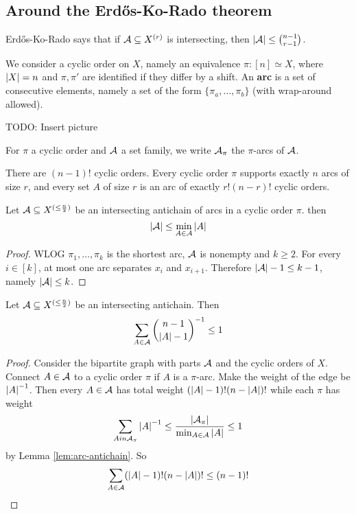 \documentclass{article}
\begin{document}
\clearpage

\subsection{Around the Erd\H os-Ko-Rado theorem}

Erd\H os-Ko-Rado says that if $\mathcal A \subseteq X^{(r)}$ is intersecting, then $\left\lvert \mathcal A\right\rvert \le \binom{n - 1}{r - 1}$.

\newlec

\begin{defi}
  We consider a cyclic order on $X$, namely an equivalence $\pi : [n] \simeq X$, where $\left\lvert X\right\rvert = n$ and $\pi, \pi'$ are identified if they differ by a shift. An {\bf arc} is a set of consecutive elements, namely a set of the form $\{\pi_a, \dots, \pi_b\}$ (with wrap-around allowed).
  
  TODO: Insert picture
  
  For $\pi$ a cyclic order and $\mathcal A$ a set family, we write $\mathcal A_\pi$ the $\pi$-arcs of $\mathcal A$.

  There are $(n - 1)!$ cyclic orders. Every cyclic order $\pi$ supports exactly $n$ arcs of size $r$, and every set $A$ of size $r$ is an arc of exactly $r!(n - r)!$ cyclic orders.
\end{defi}

\begin{nlemma}\label{lem:arc-antichain}
  Let $\mathcal A \subseteq X^{(\le \frac n2)}$ be an intersecting antichain of arcs in a cyclic order $\pi$. then
  $$\left\lvert \mathcal A\right\rvert \le \min_{A \in \mathcal A} \left\lvert A\right\rvert$$
\end{nlemma}
\begin{proof}
  WLOG $\pi_1, \dots, \pi_k$ is the shortest arc, $\mathcal A$ is nonempty and $k \ge 2$. For every $i \in [k]$, at most one arc separates $x_i$ and $x_{i + 1}$. Therefore $\left\lvert \mathcal A\right\rvert - 1 \le k - 1$, namely $\left\lvert \mathcal A\right\rvert \le k$.
\end{proof}

\begin{nthm}
  Let $\mathcal A \subseteq X^{(\le \frac n2)}$ be an intersecting antichain. Then
  $$\sum_{A \in \mathcal A} \binom{n - 1}{\left\lvert A\right\rvert - 1}^{-1} \le 1$$
\end{nthm}
\begin{proof}
  Consider the bipartite graph with parts $\mathcal A$ and the cyclic orders of $X$. Connect $A \in \mathcal A$ to a cyclic order $\pi$ if $A$ is a $\pi$-arc. Make the weight of the edge be $\left\lvert A\right\rvert^{-1}$. Then every $A \in \mathcal A$ has total weight $(\left\lvert A\right\rvert - 1)!(n - \left\lvert A\right\rvert)!$ while each $\pi$ has weight
  $$\sum_{A in \mathcal A_\pi} \left\lvert A\right\rvert^{-1} \le \frac{\left\lvert \mathcal A_\pi\right\rvert}{\min_{A \in \mathcal A} \left\lvert A\right\rvert} \le 1$$
  by Lemma \ref{lem:arc-antichain}. So
  $$\sum_{A \in \mathcal A} (\left\lvert A\right\rvert - 1)!(n - \left\lvert A\right\rvert)! \le (n - 1)!$$
\end{proof}
\end{document}
